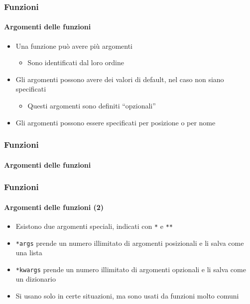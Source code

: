 \begin{contentframe}
    \frametitle{Funzioni}
    \framesubtitle{Argomenti delle funzioni}

    \begin{itemize}
        \item Una funzione può avere più argomenti
        \begin{itemize}
            \item Sono identificati dal loro ordine
        \end{itemize}

        \bigskip
        \item Gli argomenti possono avere dei valori di default, nel caso non siano specificati
        \begin{itemize}
            \item Questi argomenti sono definiti ``opzionali''
        \end{itemize}

        \bigskip
        \item Gli argomenti possono essere specificati per posizione o per nome
    \end{itemize}
\end{contentframe}

\begin{contentframe}
    \frametitle{Funzioni}
    \framesubtitle{Argomenti delle funzioni}

    \centering
\end{contentframe}

\begin{contentframe}
    \frametitle{Funzioni}
    \framesubtitle{Argomenti delle funzioni (2)}

    \begin{itemize}
        \item Esistono due argomenti speciali, indicati con \texttt{*} e \texttt{**}
        
        \bigskip
        \item \texttt{*args} prende un numero illimitato di argomenti posizionali e li salva come una lista

        \bigskip
        \item \texttt{*kwargs} prende un numero illimitato di argomenti opzionali e li salva come un dizionario

        \bigskip
        \item Si usano solo in certe situazioni, ma sono usati da funzioni molto comuni 
    \end{itemize}
\end{contentframe}

